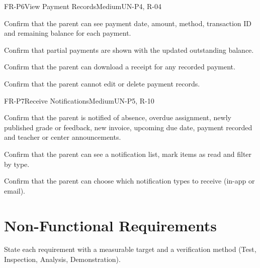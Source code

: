 \begin{userstory}{FR-P6}{View Payment Records}{Medium}{UN-P4, R-04}
  \begin{confirmation}
    \item Confirm that the parent can see payment date, amount, method, transaction ID and remaining balance for each payment.
    \item Confirm that partial payments are shown with the updated outstanding balance.
    \item Confirm that the parent can download a receipt for any recorded payment.
    \item Confirm that the parent cannot edit or delete payment records.
  \end{confirmation}
\end{userstory}

\begin{userstory}{FR-P7}{Receive Notifications}{Medium}{UN-P5, R-10}
  \begin{confirmation}
    \item Confirm that the parent is notified of absence, overdue assignment, newly published grade or feedback, new invoice, upcoming due date, payment recorded and teacher or center announcements.
    \item Confirm that the parent can see a notification list, mark items as read and filter by type.
    \item Confirm that the parent can choose which notification types to receive (in-app or email).
  \end{confirmation}
\end{userstory}

\section{Non-Functional Requirements}\label{sec:nfr}
\begin{guidance}
State each requirement with a measurable target and a verification method (Test, Inspection, Analysis, Demonstration).
\end{guidance}

